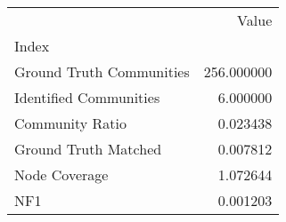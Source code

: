 \begin{tabular}{lr}
\toprule
{} &       Value \\
Index                    &             \\
\midrule
Ground Truth Communities &  256.000000 \\
Identified Communities   &    6.000000 \\
Community Ratio          &    0.023438 \\
Ground Truth Matched     &    0.007812 \\
Node Coverage            &    1.072644 \\
NF1                      &    0.001203 \\
\bottomrule
\end{tabular}

